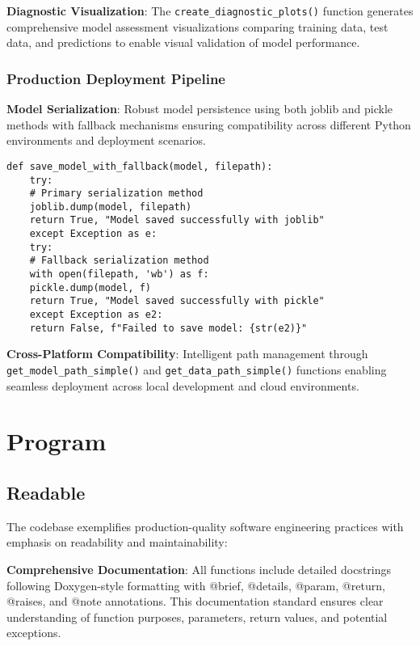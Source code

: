 \textbf{Diagnostic Visualization}: The \texttt{create\_diagnostic\_plots()} function generates comprehensive model assessment visualizations comparing training data, test data, and predictions to enable visual validation of model performance.

\subsubsection{Production Deployment Pipeline}

\textbf{Model Serialization}: Robust model persistence using both joblib and pickle methods with fallback mechanisms ensuring compatibility across different Python environments and deployment scenarios.

\begin{lstlisting}[language=MyPython, caption={Model Serialization with Fallback}]
	def save_model_with_fallback(model, filepath):
	try:
	# Primary serialization method
	joblib.dump(model, filepath)
	return True, "Model saved successfully with joblib"
	except Exception as e:
	try:
	# Fallback serialization method
	with open(filepath, 'wb') as f:
	pickle.dump(model, f)
	return True, "Model saved successfully with pickle"
	except Exception as e2:
	return False, f"Failed to save model: {str(e2)}"
\end{lstlisting}

\textbf{Cross-Platform Compatibility}: Intelligent path management through \texttt{get\_model\_path\_simple()} and \texttt{get\_data\_path\_simple()} functions enabling seamless deployment across local development and cloud environments.

\section{Program}

\subsection{Readable}

The codebase exemplifies production-quality software engineering practices with emphasis on readability and maintainability:

\textbf{Comprehensive Documentation}: All functions include detailed docstrings following Doxygen-style formatting with @brief, @details, @param, @return, @raises, and @note annotations. This documentation standard ensures clear understanding of function purposes, parameters, return values, and potential exceptions.

